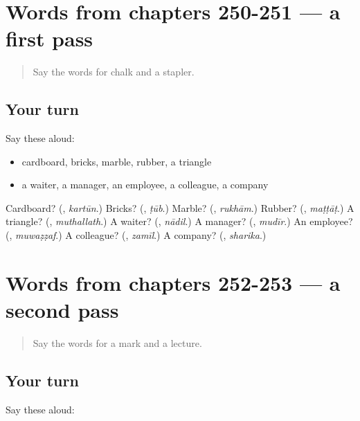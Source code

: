 \section[(dialogue)]{Words from chapters 250-251 — a first pass}

\label{lesson:AR-R253-first-pass-words-from-chapters-250-251}



\begin{quote}
Say the words for chalk and a stapler.
\end{quote}

\subsection*{Your turn}
Say these aloud:

\begin{itemize}
\raggedright
  \item cardboard, bricks, marble, rubber, a triangle
  \item a waiter, a manager, an employee, a colleague, a company
\end{itemize}

\begin{tcolorbox}[breakable,colback=teal!4,colframe=teal!35!black,title={Before you move on}]
Cardboard? (\textbf{}, \emph{kartūn}.) Bricks? (\textbf{}, \emph{ṭūb}.) Marble? (\textbf{}, \emph{rukhām}.) Rubber? (\textbf{}, \emph{maṭṭāṭ}.) A triangle? (\textbf{}, \emph{muthallath}.) A waiter? (\textbf{}, \emph{nādil}.) A manager? (\textbf{}, \emph{mudīr}.) An employee? (\textbf{}, \emph{muwaẓẓaf}.) A colleague? (\textbf{}, \emph{zamīl}.) A company? (\textbf{}, \emph{sharika}.)
\end{tcolorbox}
\section[(dialogue)]{Words from chapters 252-253 — a second pass}

\label{lesson:AR-R253-second-pass-words-from-chapters-252-253}



\begin{quote}
Say the words for a mark and a lecture.
\end{quote}

\subsection*{Your turn}
Say these aloud:

